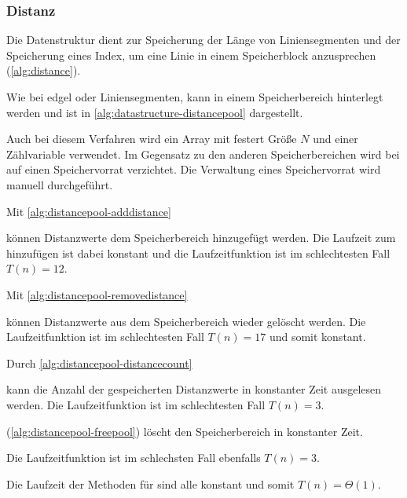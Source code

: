 \subsubsection{Distanz} %
\label{sub:distanz}

Die Datenstruktur  dient zur Speicherung der Länge von Liniensegmenten und der Speicherung eines
 Index, um eine Linie in einem Speicherblock anzusprechen (\autoref{alg:distance}).


Wie bei \gls{edgel} oder Liniensegmenten, kann  in einem Speicherbereich hinterlegt werden und ist
 in \autoref{alg:datastructure-distancepool} dargestellt.

Auch bei diesem Verfahren wird ein Array mit festert Größe $N$ und einer Zählvariable verwendet. Im Gegensatz zu den
 anderen Speicherbereichen wird bei  auf einen Speichervorrat verzichtet. Die Verwaltung eines
 Speichervorrat wird manuell durchgeführt.

Mit \autoref{alg:distancepool-adddistance}

können Distanzwerte dem Speicherbereich hinzugefügt werden. Die Laufzeit zum hinzufügen ist dabei konstant und die
 Laufzeitfunktion ist im schlechtesten Fall $T(n) = 12$.

Mit \autoref{alg:distancepool-removedistance}

können Distanzwerte aus dem Speicherbereich wieder gelöscht werden. Die Laufzeitfunktion ist im schlechtesten Fall
 $T(n) = 17$ und somit konstant.

Durch \autoref{alg:distancepool-distancecount}

 kann die Anzahl der gespeicherten Distanzwerte in konstanter Zeit ausgelesen werden. Die Laufzeitfunktion ist im schlechtesten Fall $T(n) = 3$.

 (\autoref{alg:distancepool-freepool}) löscht den Speicherbereich in konstanter Zeit.

Die Laufzeitfunktion ist im schlechsten Fall ebenfalls $T(n) = 3$.

Die Laufzeit der Methoden für  sind alle konstant und somit $T(n)=\Theta(1)$.

